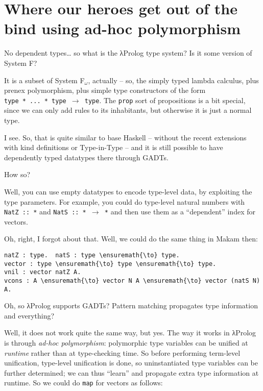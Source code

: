 \section{Where our heroes get out of the bind using ad-hoc
polymorphism}\label{where-our-heroes-get-out-of-the-bind-using-ad-hoc-polymorphism}

\heroSTUDENT{} No dependent types\ldots{} so what is the \foreignlanguage{greek}{λ}Prolog type system?
Is it some version of System F?

\heroADVISOR{} It is a subset of System F\(_\omega\), actually -- so, the
simply typed lambda calculus, plus prenex polymorphism, plus simple type
constructors of the form
\texttt{type\ *\ ...\ *\ type\ \ensuremath{\to}\ type}. The \texttt{prop}
sort of propositions is a bit special, since we can only add rules to
its inhabitants, but otherwise it is just a normal type.

\heroSTUDENT{} I see. So, that is quite similar to base Haskell -- without the
recent extensions with kind definitions \citep{yorgey2012giving} or
Type-in-Type \citep{weirich2013system} -- and it is still possible to
have dependently typed datatypes there through GADTs.

\heroADVISOR{} How so?

\heroSTUDENT{} Well, you can use empty datatypes to encode type-level data, by
exploiting the type parameters. For example, you could do type-level
natural numbers with \texttt{NatZ\ ::\ *} and
\texttt{NatS\ ::\ *\ \ensuremath{\to}\ *} and then use them as a
``dependent'' index for vectors.

\heroADVISOR{} Oh, right, I forgot about that. Well, we could do the same
thing in Makam then:

\begin{verbatim}
natZ : type.  natS : type \ensuremath{\to} type.
vector : type \ensuremath{\to} type \ensuremath{\to} type.
vnil : vector natZ A.
vcons : A \ensuremath{\to} vector N A \ensuremath{\to} vector (natS N) A.
\end{verbatim}

\heroSTUDENT{} Oh, so \foreignlanguage{greek}{λ}Prolog supports GADTs? Pattern matching propagates type
information and everything?

\heroADVISOR{} Well, it does not work quite the same way, but yes. The way it
works in \foreignlanguage{greek}{λ}Prolog is through \emph{ad-hoc polymorphism}: polymorphic type
variables can be unified at \emph{runtime} rather than at type-checking
time. So before performing term-level unification, type-level
unification is done, so uninstantiated type variables can be further
determined; we can thus ``learn'' and propagate extra type information
at runtime. So we could do \texttt{map} for vectors as follows:

